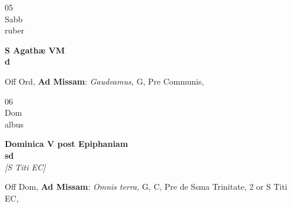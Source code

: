 \documentclass[10pt, openany]{book}
\begin{document}
        \begin{center}
            \begin{minipage}{3.5in}
                \vspace{2em}
                \begin{minipage}{0.5in}
                    {\Huge 05} \\
                    {\normalsize Sabb} \\
                    {\normalsize ruber}
                \end{minipage}
                \begin{minipage}{3.0in}
                    \textbf{ \large S Agathæ VM \\
                    \textnormal{\normalsize d}} \\ 
                \end{minipage}
                \begin{justify}Off Ord, \textbf{Ad Missam}: \textit{Gaudeamus,} G, Pre Communis,  
                \end{justify}
            \end{minipage}
        \end{center}
    
        \begin{center}
            \begin{minipage}{3.5in}
                \vspace{2em}
                \begin{minipage}{0.5in}
                    {\Huge 06} \\
                    {\normalsize Dom} \\
                    {\normalsize albus}
                \end{minipage}
                \begin{minipage}{3.0in}
                    \textbf{ \large Dominica V post Epiphaniam \\
                    \textnormal{\normalsize sd}} \\ \textit{[S Titi EC]} \\ 
                \end{minipage}
                \begin{justify}Off Dom, \textbf{Ad Missam}: \textit{Omnis terra,} G, C, Pre de Ssma Trinitate, 2 or S Titi EC,  
                \end{justify}
            \end{minipage}
        \end{center}
    
\end{document}
